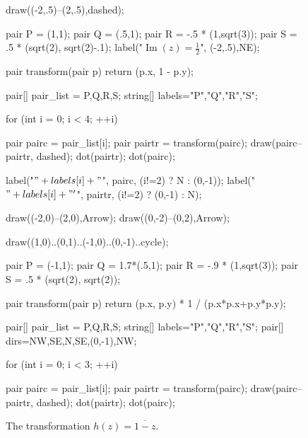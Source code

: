\documentclass[../gatm.tex]{subfiles}
\begin{document}
\begin{figure}[h]
\begin{center}
\begin{minipage}[b]{0.45\textwidth}
\begin{center}
\begin{minipage}[b]{\textwidth}
\begin{asy}[width=0.7\textwidth]
						draw((-2,.5)--(2,.5),dashed);
						
						pair P = (1,1);
						pair Q = (.5,1);
						pair R = -.5 * (1,sqrt(3));
						pair S = .5 * (sqrt(2), sqrt(2)-.1);
						label("$\operatorname{Im}(z)=\frac{1}{2}$", (-2,.5),NE);
						
						pair transform(pair p) {
							return (p.x, 1 - p.y);
						}
						
						pair[] pair_list = {P,Q,R,S};
						string[] labels={"P","Q","R","S"};
						
						for (int i = 0; i < 4; ++i) {
							pair pairc = pair_list[i];
							pair pairtr = transform(pairc);
							draw(pairc--pairtr, dashed);
							dot(pairtr);
							dot(pairc);
							
							label("$" + labels[i] + "$", pairc, (i!=2) ? N : (0,-1));
							label("$" + labels[i] + "'$", pairtr, (i!=2) ? (0,-1) : N);
						}
					\end{asy}
				\end{minipage}
			\end{center}
			\vspace*{-2\baselineskip}
			\begin{center}
				\begin{minipage}[t]{\textwidth}
					\caption{The transformation $h(z)=\overline{1-z}$.}
					\label{fig:function_h}
				\end{minipage}
			\end{center}
		
			\begin{center}
				\begin{minipage}[b]{\textwidth}
					\centering
					\begin{asy}[width=0.7\textwidth]
						draw((-2,0)--(2,0),Arrow);
						draw((0,-2)--(0,2),Arrow);
						
						draw((1,0)..(0,1)..(-1,0)..(0,-1)..cycle);
						
						pair P = (-1,1);
						pair Q = 1.7*(.5,1);
						pair R = -.9 * (1,sqrt(3));
						pair S = .5 * (sqrt(2), sqrt(2));
						
						pair transform(pair p) {
							return (p.x, p.y) * 1 / (p.x*p.x+p.y*p.y);
						}
						
						pair[] pair_list = {P,Q,R,S};
						string[] labels={"P","Q","R","S"};
						pair[] dirs={NW,SE,N,SE,(0,-1),NW};
						
						for (int i = 0; i < 3; ++i) {
							pair pairc = pair_list[i];
							pair pairtr = transform(pairc);
							draw(pairc--pairtr, dashed);
							dot(pairtr);
							dot(pairc);
							
}
\end{asy}
\end{minipage}
\end{center}
\end{minipage}
\end{center}
\end{figure}
\end{document}
